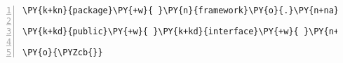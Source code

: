 \begin{Verbatim}[commandchars=\\\{\},numbers=left,firstnumber=1,stepnumber=1,frame=single,fontsize=\small]
\PY{k+kn}{package}\PY{+w}{ }\PY{n}{framework}\PY{o}{.}\PY{n+na}{process}\PY{o}{;}

\PY{k+kd}{public}\PY{+w}{ }\PY{k+kd}{interface}\PY{+w}{ }\PY{n+nc}{Input}\PY{+w}{ }\PY{o}{\PYZob{}}

\PY{o}{\PYZcb{}}
\end{Verbatim}
